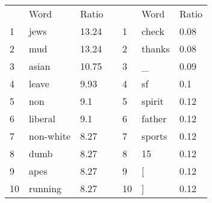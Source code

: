 \documentclass[12pt]{article}
\begin{document}
\begin{table}[!h]
\centering
\begin{tabular}{|l|l|l|l|l|l|l|}
\cline{1-3} \cline{5-7}
   & Word      & Ratio &  &    & Word   & Ratio \\ \cline{1-3} \cline{5-7} 
1  & jews      & 13.24 &  & 1  & check  & 0.08  \\ \cline{1-3} \cline{5-7} 
2  & mud       & 13.24 &  & 2  & thanks & 0.08  \\ \cline{1-3} \cline{5-7} 
3  & asian     & 10.75 &  & 3  & \_     & 0.09  \\ \cline{1-3} \cline{5-7} 
4  & leave     & 9.93  &  & 4  & sf     & 0.1   \\ \cline{1-3} \cline{5-7} 
5  & non       & 9.1   &  & 5  & spirit & 0.12  \\ \cline{1-3} \cline{5-7} 
6  & liberal   & 9.1   &  & 6  & father & 0.12  \\ \cline{1-3} \cline{5-7} 
7  & non-white & 8.27  &  & 7  & sports & 0.12  \\ \cline{1-3} \cline{5-7} 
8  & dumb      & 8.27  &  & 8  & 15     & 0.12  \\ \cline{1-3} \cline{5-7} 
9  & apes      & 8.27  &  & 9  & {[}    & 0.12  \\ \cline{1-3} \cline{5-7} 
10 & running   & 8.27  &  & 10 & {]}    & 0.12  \\ \cline{1-3} \cline{5-7} 
\end{tabular}
\end{table}
\newpage
\end{document}
